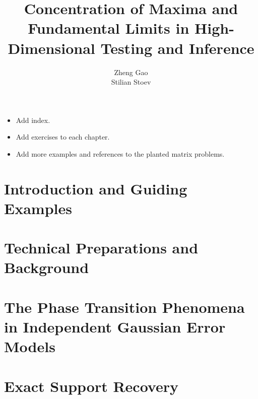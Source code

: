 \documentclass[graybox,envcountchap,sectrefs]{svmono}
\begin{document}
\author{Zheng Gao \\ Stilian Stoev}
\title{Concentration of Maxima and Fundamental Limits in High-Dimensional Testing and Inference}
\maketitle

\frontmatter%

%
%
%
%



{\color{blue}
\begin{itemize}
  \item Add index.
  \item Add exercises to each chapter.
  \item Add more examples and references to the planted matrix problems.
\end{itemize}
}

\tableofcontents





\mainmatter%


\chapter{Introduction and Guiding Examples}
\label{chap:intro}


\chapter{Technical Preparations and Background}
\label{chap:background}



\chapter{The Phase Transition Phenomena in Independent Gaussian Error Models} 
\label{chap:phase-transitions}



\chapter{Exact Support Recovery}%
\label{chap:exact-support-recovery}

\end{document}

